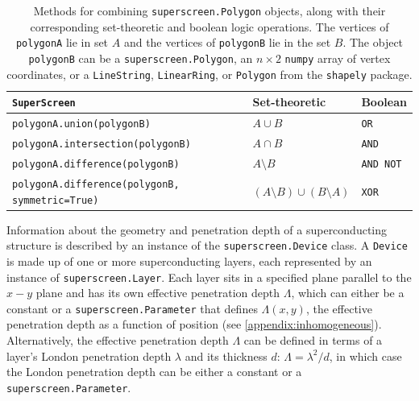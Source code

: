 \documentclass[final,3p,times,twocolumn]{elsarticle}
\newcommand{\inline}[1]{\texttt{#1}\xspace}
\newcommand{\SuperScreen}{\inline{SuperScreen}}
\begin{document}
\begin{table}
\centering
\begin{tabular}{|l|l|l|}
\hline
\SuperScreen                             & Set-theoretic  & Boolean   \\ \hline \hline
\inline{polygonA.union(polygonB)}        & $A\cup B$      & \inline{OR}      \\
\inline{polygonA.intersection(polygonB)} & $A\cap B$      & \inline{AND}     \\
\inline{polygonA.difference(polygonB)}   & $A\setminus B$ & \inline{AND NOT} \\
\inline{polygonA.difference(polygonB, symmetric=True)} & $(A\setminus B)\cup(B\setminus A)$ & \inline{XOR} \\ \hline
\end{tabular}
\caption{Methods for combining \inline{superscreen.Polygon} objects, along with their corresponding set-theoretic and boolean logic operations. The vertices of \inline{polygonA} lie in set $A$ and the vertices of \inline{polygonB} lie in the set $B$. The object \inline{polygonB} can be a \inline{superscreen.Polygon}, an $n\times 2$ \inline{numpy} array of vertex coordinates, or a \inline{LineString}, \inline{LinearRing}, or \inline{Polygon} from the \inline{shapely} package.}
\label{table:polygon}
\end{table}

Information about the geometry and penetration depth of a superconducting structure is described by an instance of the \inline{superscreen.Device} class. A \inline{Device} is made up of one or more superconducting layers, each represented by an instance of  \inline{superscreen.Layer}. Each layer sits in a specified plane parallel to the $x-y$ plane and has its own effective penetration depth $\Lambda$, which can either be a constant or a \inline{superscreen.Parameter} that defines $\Lambda(x, y)$, the effective penetration depth as a function of position (see \ref{appendix:inhomogeneous}). Alternatively, the effective penetration depth $\Lambda$ can be defined in terms of a layer's London penetration depth $\lambda$ and its thickness $d$: $\Lambda=\lambda^2/d$, in which case the London penetration depth can be either a constant or a \inline{superscreen.Parameter}.
\end{document}
